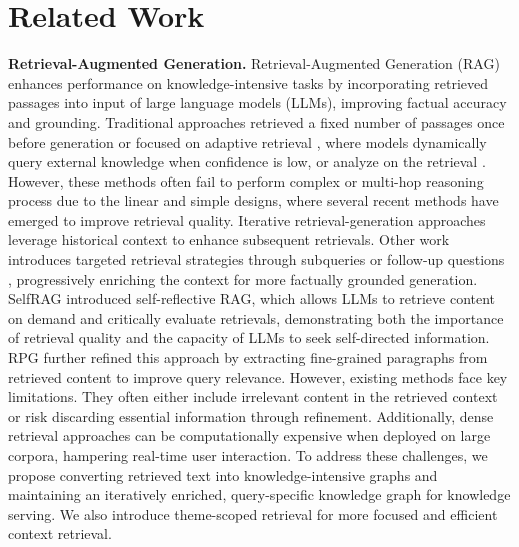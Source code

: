 \section{Related Work}
\textbf{Retrieval-Augmented Generation.} Retrieval-Augmented Generation (RAG) \citep{lewis2020retrieval, guu2020retrieval} enhances performance on knowledge-intensive tasks by incorporating retrieved passages into input of large language models (LLMs), improving factual accuracy and grounding. Traditional approaches retrieved a fixed number of passages once before generation \citep{shao2023enhancing, es-etal-2024-ragas, lyu2024crudragcomprehensivechinesebenchmark} or focused on adaptive retrieval \cite{jiang2023active}, where models dynamically query external knowledge when confidence is low, or analyze on the retrieval \cite{kim2024sure}. However, these methods often fail to perform complex or multi-hop reasoning process due to the linear and simple designs, where several recent methods have emerged to improve retrieval quality. Iterative retrieval-generation approaches \cite{shao2023enhancing,guan2024amor} leverage historical context to enhance subsequent retrievals. Other work introduces targeted retrieval strategies through subqueries \cite{khattab2023demonstratesearchpredict} or follow-up questions \cite{yao2023react,press2023measuring}, progressively enriching the context for more factually grounded generation. SelfRAG \cite{asai2023self} introduced self-reflective RAG, which allows LLMs to retrieve content on demand and critically evaluate retrievals, demonstrating both the importance of retrieval quality and the capacity of LLMs to seek self-directed information. RPG \cite{lyu2024retrieve} further refined this approach by extracting fine-grained paragraphs from retrieved content to improve query relevance.
However, existing methods face key limitations. They often either include irrelevant content in the retrieved context or risk discarding essential information through refinement. Additionally, dense retrieval approaches can be computationally expensive when deployed on large corpora, hampering real-time user interaction. To address these challenges, we propose converting retrieved text into knowledge-intensive graphs and maintaining an iteratively enriched, query-specific knowledge graph for knowledge serving. We also introduce theme-scoped retrieval for more focused and efficient context retrieval.


